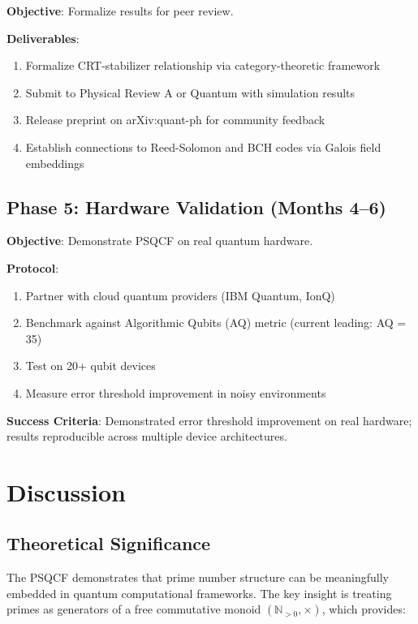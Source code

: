 \documentclass[12pt,a4paper]{article}
\begin{document}
\textbf{Objective}: Formalize results for peer review.

\textbf{Deliverables}:
\begin{enumerate}
    \item Formalize CRT-stabilizer relationship via category-theoretic framework
    \item Submit to Physical Review A or Quantum with simulation results
    \item Release preprint on arXiv:quant-ph for community feedback
    \item Establish connections to Reed-Solomon and BCH codes via Galois field embeddings
\end{enumerate}

\subsection{Phase 5: Hardware Validation (Months 4--6)}

\textbf{Objective}: Demonstrate PSQCF on real quantum hardware.

\textbf{Protocol}:
\begin{enumerate}
    \item Partner with cloud quantum providers (IBM Quantum, IonQ)
    \item Benchmark against Algorithmic Qubits (AQ) metric (current leading: AQ = 35)
    \item Test on 20+ qubit devices
    \item Measure error threshold improvement in noisy environments
\end{enumerate}

\textbf{Success Criteria}: Demonstrated error threshold improvement on real hardware; results reproducible across multiple device architectures.

\section{Discussion}
\label{sec:discussion}

\subsection{Theoretical Significance}

The PSQCF demonstrates that prime number structure can be meaningfully embedded in quantum computational frameworks. The key insight is treating primes as generators of a free commutative monoid $(\mathbb{N}_{>0}, \times)$, which provides:
\end{document}
